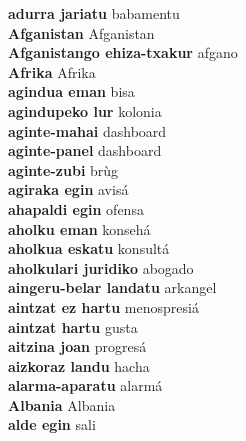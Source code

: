 \textbf{ adurra jariatu  } babamentu \\
\textbf{ Afganistan  } Afganistan \\
\textbf{ Afganistango ehiza-txakur  } afgano \\
\textbf{ Afrika  } Afrika \\
\textbf{ agindua eman  } bisa \\
\textbf{ agindupeko lur  } kolonia \\
\textbf{ aginte-mahai  } dashboard \\
\textbf{ aginte-panel  } dashboard \\
\textbf{ aginte-zubi  } brùg \\
\textbf{ agiraka egin  } avisá \\
\textbf{ ahapaldi egin  } ofensa \\
\textbf{ aholku eman  } konsehá \\
\textbf{ aholkua eskatu  } konsultá \\
\textbf{ aholkulari juridiko  } abogado \\
\textbf{ aingeru-belar landatu  } arkangel \\
\textbf{ aintzat ez hartu  } menospresiá \\
\textbf{ aintzat hartu  } gusta \\
\textbf{ aitzina joan  } progresá \\
\textbf{ aizkoraz landu  } hacha \\
\textbf{ alarma-aparatu  } alarmá \\
\textbf{ Albania  } Albania \\
\textbf{ alde egin  } sali \\
